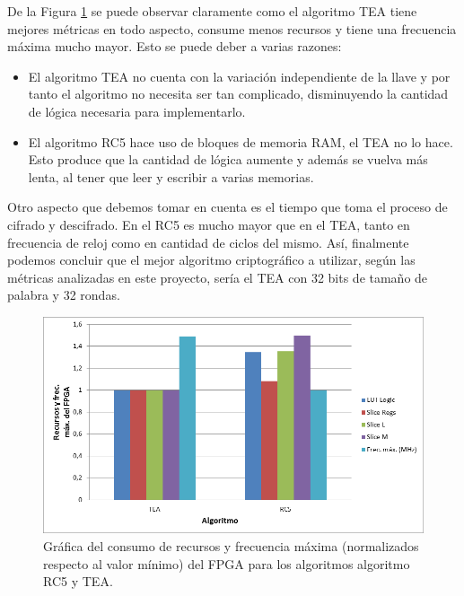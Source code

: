 De la Figura \ref{figNormalizadoComparativa} se puede observar claramente como el algoritmo TEA tiene mejores métricas en todo aspecto, consume menos recursos y tiene una frecuencia máxima mucho mayor. Esto se puede deber a varias razones:
\begin{itemize}
\item El algoritmo TEA no cuenta con la variación independiente de la llave y por tanto el algoritmo no necesita ser tan complicado, disminuyendo la cantidad de lógica necesaria para implementarlo.

\item El algoritmo RC5 hace uso de bloques de memoria RAM, el TEA no lo hace. Esto produce que la cantidad de lógica aumente y además se vuelva más lenta, al tener que leer y escribir a varias memorias.
\end{itemize}
Otro aspecto que debemos tomar en cuenta es el tiempo que toma el proceso de cifrado y descifrado. En el RC5 es mucho mayor que en el TEA, tanto en frecuencia de reloj como en cantidad de ciclos del mismo. Así, finalmente podemos concluir que el mejor algoritmo criptográfico a utilizar, según las métricas analizadas en este proyecto, sería el TEA con 32 bits de tamaño de palabra y 32 rondas.
\begin{figure}
	\centering
	\includegraphics[width=1\textwidth]{./images/figNormalizadoComparativo}
	\caption{Gráfica del consumo de recursos y frecuencia máxima (normalizados respecto al valor mínimo) del FPGA para los algoritmos algoritmo RC5 y TEA.}
	\label{figNormalizadoComparativa}
\end{figure}
